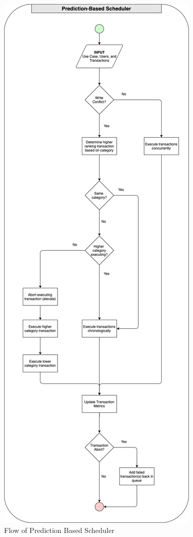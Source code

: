 \begin{figure}
\centering
\includegraphics[scale=0.33]{images/PBSScheduler.png}
\caption{Flow of Prediction Based Scheduler}
\label{image:flow_of_pbs}
\end{figure}